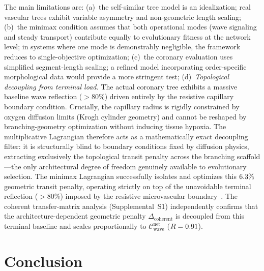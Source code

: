 \documentclass[11pt,a4paper]{article}
\theoremstyle{remark}
\begin{document}
The main limitations are:
(a)~the self-similar tree model is an idealization; real vascular trees exhibit
variable asymmetry and non-geometric length scaling;
(b)~the minimax condition assumes that both operational modes (wave signaling
and steady transport) contribute equally to evolutionary fitness at the network
level; in systems where one mode is demonstrably negligible, the framework
reduces to single-objective optimization;
(c)~the coronary evaluation uses simplified segment-length scaling; a refined
model incorporating order-specific morphological data \cite{Kassab1993} would
provide a more stringent test;
(d)~\emph{Topological decoupling from terminal load.}
The actual coronary tree exhibits a massive baseline wave reflection
($>\!80\%$) driven entirely by the resistive capillary boundary condition.
Crucially, the capillary radius is rigidly constrained by oxygen diffusion
limits (Krogh cylinder geometry) and cannot be reshaped by branching-geometry
optimization without inducing tissue hypoxia. The multiplicative Lagrangian
therefore acts as a mathematically exact decoupling filter: it is structurally
blind to boundary conditions fixed by diffusion physics, extracting
exclusively the topological transit penalty across the branching scaffold---the
only architectural degree of freedom genuinely available to evolutionary
selection. The minimax Lagrangian successfully isolates and optimizes this
$6.3\%$ geometric transit penalty, operating strictly on top of the
unavoidable terminal reflection ($>\!80\%$) imposed by the resistive
microvascular boundary~\cite{Nichols2011,Westerhof1972}. The coherent
transfer-matrix analysis (Supplemental~S1) independently confirms that the
architecture-dependent geometric penalty $\Delta_\mathrm{coherent}$ is
decoupled from this terminal baseline and scales proportionally to
$\mathcal{C}^{\mathrm{net}}_{\mathrm{wave}}$ ($R = 0.91$).

\section{Conclusion}
\label{sec:conclusion}
\end{document}
